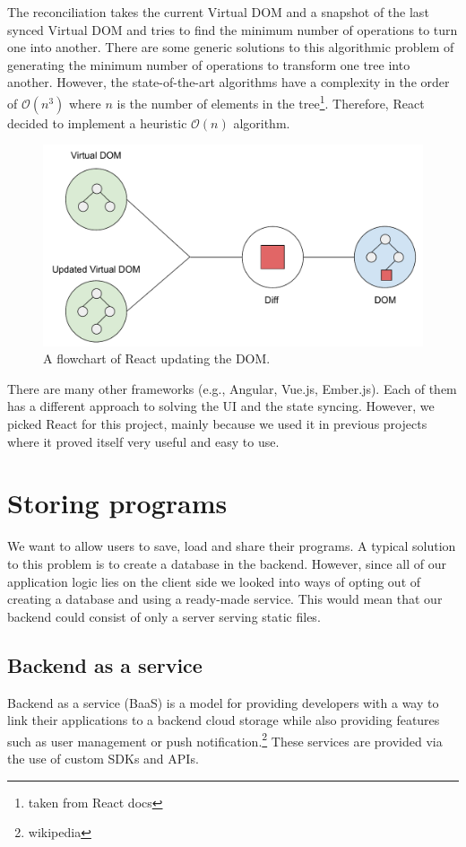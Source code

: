 The reconciliation takes the current Virtual DOM and a snapshot of the last synced Virtual DOM and tries to find the minimum number of operations to turn
one into another. There are some generic solutions to this algorithmic problem of generating the minimum number of operations to transform one tree into another.
However, the state-of-the-art algorithms \cite{TreeEditDistance} have a complexity in the order of $\mathcal{O}(n^3)$ where $n$ is the number of elements in
the tree\footnote{taken from React docs}. Therefore, React decided to implement a heuristic $\mathcal{O}(n)$ algorithm.

\begin{figure}[!hbt]
    \centering
	\includegraphics[width=\textwidth]{../img/virtual_dom}
	\caption{A flowchart of React updating the DOM.}
	\label{fig:chap2:virtual_dom}
\end{figure}

There are many other frameworks (e.g., Angular, Vue.js, Ember.js). Each of them has a different approach to solving the UI and the state syncing. However, we picked
React for this project, mainly because we used it in previous projects where it proved itself very useful and easy to use.

\section{Storing programs}
We want to allow users to save, load and share their programs. A typical solution to this problem is to create a database in the backend. However, since all
of our application logic lies on the client side we looked into ways of opting out of creating a database and using a ready-made service. This would mean that
our backend could consist of only a server serving static files.

\subsection{Backend as a service}
Backend as a service (BaaS) is a model for providing developers with a way to link their applications to a backend cloud storage while also providing features
such as user management or push notification.\footnote{wikipedia} These services are provided via the use of custom SDKs and APIs.

